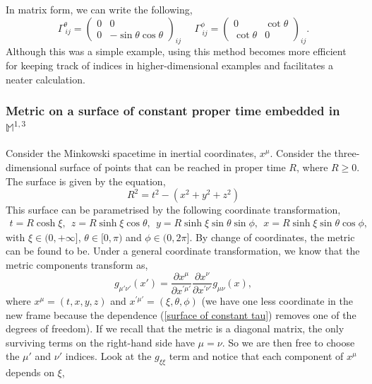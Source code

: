 In matrix form, we can write the following, 
\begin{equation}
\Gamma^{\theta}_{\ ij} = 
\begin{pmatrix}
    0 & 0 \\
    0 & -\sin\theta\cos\theta
\end{pmatrix}_{ij}\ \ \ \ \ \
\Gamma^{\phi}_{\ ij} = 
\begin{pmatrix}
    0 & \cot\theta \\
    \cot\theta & 0
\end{pmatrix}_{ij}.
\end{equation}
Although this was a simple example, using this method becomes more efficient for keeping track of indices in higher-dimensional examples and facilitates a neater calculation. 
\subsubsection{Metric on a surface of constant proper time embedded in $\mathbb{M}^{1,3}$}
Consider the Minkowski spacetime in inertial coordinates, $x^{\mu}$. Consider the three-dimensional surface of points that can be reached in proper time $R$, where $R\geq 0$. The surface is given by the equation, 
\begin{equation}\label{surface of constant tau}
    R^2 = t^2 - (x^2 + y^2 + z^2)
\end{equation}
This surface can be parametrised by the following coordinate transformation, 
\begin{equation}
    \begin{split}
        t = R\cosh\xi,\ \ 
        z = R\sinh\xi\cos\theta,\ \ 
        y = R\sinh\xi\sin\theta\sin\phi,\ \
        x = R\sinh\xi\sin\theta\cos\phi,\ \ 
    \end{split}
\end{equation}
with $\xi\in(0,+\infty]$, $\theta\in[0, \pi)$ and $\phi\in(0,2\pi]$. By change of coordinates, the metric can be found to be. Under a general coordinate transformation, we know that the metric components transform as, 
\begin{equation}
    g_{\mu'\nu'}(x') = \frac{\partial x^{\mu}}{\partial x^{'\mu'}}\frac{\partial x^{\nu}}{\partial x^{'\nu'}}g_{\mu\nu}(x),
\end{equation}
where $x^{\mu} = (t,x,y,z)$ and $x^{'\mu'} = (\xi, \theta,\phi)$ (we have one less coordinate in the new frame because the dependence (\ref{surface of constant tau}) removes one of the degrees of freedom). If we recall that the metric is a diagonal matrix, the only surviving terms on the right-hand side have $\mu = \nu$. So we are then free to choose the $\mu'$ and $\nu'$ indices. Look at the $g_{\xi\xi}$ term and notice that each component of $x^{\mu}$ depends on $\xi$, 
